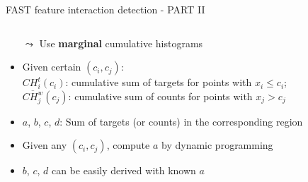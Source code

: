 \documentclass[11pt,compress,t,notes=noshow, aspectratio=169, xcolor=table]{beamer}
\begin{document}
\begin{frame}{FAST feature interaction detection - PART II}
\begin{columns}[T, totalwidth=\textwidth]
\begin{column}{0.5\textwidth}
\begin{itemize}
    $\leadsto$ Use \textbf{marginal} cumulative histograms 
    \item Given certain $(c_i, c_j)$:\\
    $CH_i^t(c_i)$: cumulative sum of targets for points with $x_i\leq c_i$;\\
    $\overline{CH_j^w }(c_j)$: cumulative sum of counts for points with $x_j>c_j$
    \item $a$, $b$, $c$, $d$: Sum of targets (or counts) in the corresponding region
    \item Given any $(c_i, c_j)$, compute $a$ by dynamic programming
    \item $b$, $c$, $d$ can be easily derived with known $a$
\end{itemize}
\end{column}
\end{columns}

\end{frame}
\end{document}
